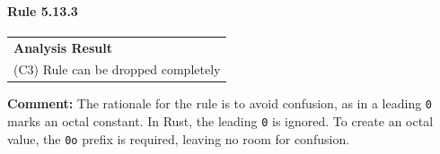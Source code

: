 \paragraph{Rule 5.13.3}
\begin{longtable}{p{13cm}}
\textbf{Analysis Result} \\
(C3) Rule can be dropped completely \\
\end{longtable}
\textbf{Comment:} The rationale for the rule is to avoid confusion, as in \Cpp a leading \texttt{0} marks an octal constant. In Rust, the leading \texttt{0} is ignored. To create an octal value, the \texttt{0o} prefix is required, leaving no room for confusion. \\



